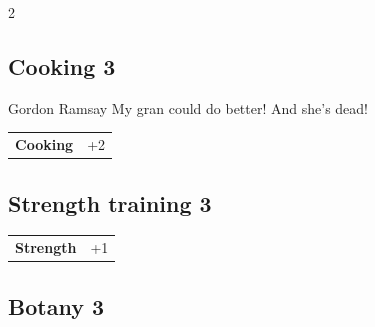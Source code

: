 \begin{multicols}{2}
\begin{tcolorbox}

\end{tcolorbox}

\begin{tcolorbox}
    \subsection*{Cooking \hfill \small{3 }}
    \tcblower


\begin{pquote}{Gordon Ramsay}
My gran could do better! And she’s dead!
\end{pquote}

\vspace{3mm}

\begin{tabular}{@{}ll@{}}
    \textbf{Cooking} & +2\\
\end{tabular}


\end{tcolorbox}

\begin{tcolorbox}
    \subsection*{Strength training \hfill \small{3 }}
    \tcblower




\begin{tabular}{@{}ll@{}}
    \textbf{Strength} & +1\\
\end{tabular}


\end{tcolorbox}

\begin{tcolorbox}
    \subsection*{Botany \hfill \small{3 }}
    \tcblower





\end{tcolorbox}
\end{multicols}
